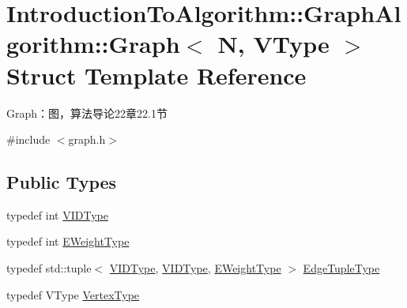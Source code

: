 \hypertarget{struct_introduction_to_algorithm_1_1_graph_algorithm_1_1_graph}{}\section{Introduction\+To\+Algorithm\+:\+:Graph\+Algorithm\+:\+:Graph$<$ N, V\+Type $>$ Struct Template Reference}
\label{struct_introduction_to_algorithm_1_1_graph_algorithm_1_1_graph}


Graph：图，算法导论22章22.1节  




{\ttfamily \#include $<$graph.\+h$>$}

\subsection*{Public Types}
\begin{DoxyCompactItemize}
\item 
typedef int \hyperlink{struct_introduction_to_algorithm_1_1_graph_algorithm_1_1_graph_a507632614d13e91d29acbf8acb0b0f0f}{V\+I\+D\+Type}
\item 
typedef int \hyperlink{struct_introduction_to_algorithm_1_1_graph_algorithm_1_1_graph_a77f6d3ef31203e0d6ebd2ed87928978a}{E\+Weight\+Type}
\item 
typedef std\+::tuple$<$ \hyperlink{struct_introduction_to_algorithm_1_1_graph_algorithm_1_1_graph_a507632614d13e91d29acbf8acb0b0f0f}{V\+I\+D\+Type}, \hyperlink{struct_introduction_to_algorithm_1_1_graph_algorithm_1_1_graph_a507632614d13e91d29acbf8acb0b0f0f}{V\+I\+D\+Type}, \hyperlink{struct_introduction_to_algorithm_1_1_graph_algorithm_1_1_graph_a77f6d3ef31203e0d6ebd2ed87928978a}{E\+Weight\+Type} $>$ \hyperlink{struct_introduction_to_algorithm_1_1_graph_algorithm_1_1_graph_ad1eb485d135eb8076a44b00904ae2f5a}{Edge\+Tuple\+Type}
\item 
typedef V\+Type \hyperlink{struct_introduction_to_algorithm_1_1_graph_algorithm_1_1_graph_a95fc613ee7f50f11c84d56c19dc6d321}{Vertex\+Type}
\end{DoxyCompactItemize}
